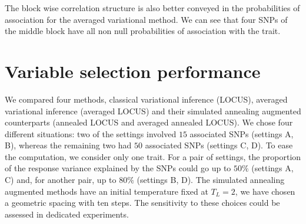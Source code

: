 \documentclass[a4paper, 11pt]{report}
\numberwithin{equation}{chapter}
\begin{document}
The block wise correlation structure is also better conveyed in the probabilities of association for the averaged variational method. We can see that four SNPs of the middle block have all non null probabilities of association with the trait. 

\section{Variable selection performance} \label{sec:varSelPerf}

We compared four methods, classical variational inference (LOCUS), averaged variational inference (averaged LOCUS) and their simulated annealing augmented counterparts (annealed LOCUS and averaged annealed LOCUS). We chose four different situations: two of the settings involved $15$ associated SNPs (settings A, B), whereas the remaining two had $50$ associated SNPs (settings C, D). To ease the computation, we consider only one trait. For a pair of settings, the proportion of the response variance explained by the SNPs could go up to $50\%$ (settings A, C) and, for another pair, up to $80\%$ (settings B, D). The simulated annealing augmented methods have an initial temperature fixed at $T_L = 2$, we have chosen a geometric spacing with ten steps. The sensitivity to these choices could be assessed in dedicated experiments.
\end{document}
